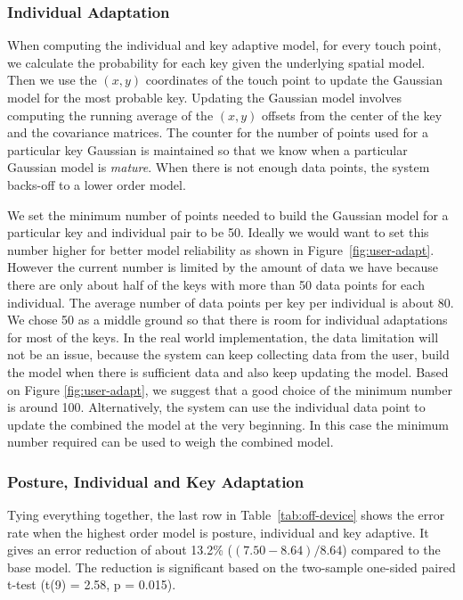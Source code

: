 \documentclass{sigchi}
\begin{document}
\subsubsection{Individual Adaptation}
When computing the individual and key adaptive model, for every touch point,
we calculate the probability for each key given the underlying spatial model.
Then we use the $(x, y)$ coordinates of the touch point to update the Gaussian model for the most probable key. Updating the Gaussian model involves computing the running average of the $(x, y)$ offsets from the center of the key and the covariance matrices. The counter for the number of points used for a particular key Gaussian is maintained so that we
know when a particular Gaussian model is \textit{mature}. When there is not enough data points, the system backs-off to a lower order model.

We set the minimum number of points needed to build the
Gaussian model for a particular key and individual pair to be 50.
Ideally we would want to set this number higher for better model reliability as 
shown in Figure~\ref{fig:user-adapt}. However the current number is limited by 
the amount of data we have because there are only about half of the keys
with more than 50 data points for each individual. The average number of data 
points per key per individual is about 80. We chose 50 as a middle ground so
that there is room for individual adaptations for most of the keys. In the real world 
implementation, the data limitation will not be an issue, because the system 
can keep collecting data from the user, build the model when there is 
sufficient data and also keep updating the model. Based on Figure
\ref{fig:user-adapt}, we suggest that a good choice of the minimum number is
around 100. Alternatively, the system can use the individual data point to 
update the combined the model at the very beginning. In this case the minimum 
number required can be used to weigh the combined model.

\subsubsection{Posture, Individual and Key Adaptation}
Tying everything together, the last row in Table~\ref{tab:off-device} shows the 
error rate when the highest order model is posture, individual and key adaptive.
It gives an error reduction of about 13.2\% ($(7.50 - 8.64) / 8.64$) compared
to the base model. The reduction is significant based on
the two-sample one-sided paired t-test (t(9) = 2.58, p = 0.015).
\end{document}
